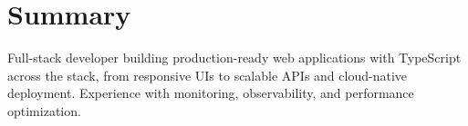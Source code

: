 \section{Summary}
Full-stack developer building production-ready web applications with TypeScript across the stack, from responsive UIs to scalable APIs and cloud-native deployment. Experience with monitoring, observability, and performance optimization.
